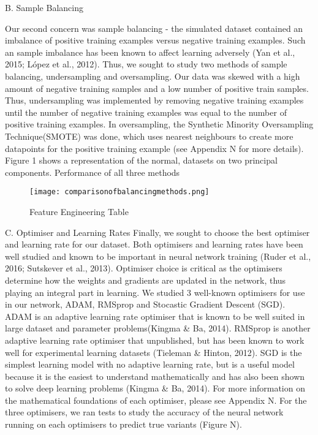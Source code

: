 \documentclass{article}
\begin{document}
B. Sample Balancing

Our second concern was sample balancing - the simulated dataset contained an imbalance of positive training examples versus negative training examples. Such an sample imbalance has been known to affect learning adversely (Yan et al., 2015; López et al., 2012). Thus, we sought to study two methods of sample balancing, undersampling and oversampling. Our data was skewed with a high amount of negative training samples and  a low number of positive train samples. Thus, undersampling was implemented by removing negative training examples until the number of negative training examples was equal to the number of positive training examples. In oversampling, the Synthetic Minority Oversampling Technique(SMOTE) was done, which uses nearest neighbours to create more datapoints for the positive training example (see Appendix N for more details). Figure 1 shows a representation of the normal, datasets on two principal components. Performance of all three methods 	


\begin{figure}[H]
\caption{Feature Engineering Table}
\texttt{[image: comparisonofbalancingmethods.png]}
\centering
\end{figure}

C. Optimiser and Learning Rates
Finally, we sought to choose the best optimiser and learning rate for our dataset. Both optimisers and learning rates have  been well studied and known to be important in neural network training (Ruder et al., 2016; Sutskever et al., 2013). Optimiser choice is critical as the optimisers determine how the weights and gradients are updated in the network, thus playing an integral part in learning. We studied 3 well-known optimisers for use in our network, ADAM, RMSprop and Stocastic Gradient Descent (SGD). ADAM is an adaptive learning rate optimiser that is known to be well suited in large dataset and parameter problems(Kingma \& Ba, 2014). RMSprop is another adaptive learning rate optimiser that unpublished, but has been known to work well for experimental learning datasets (Tieleman & Hinton, 2012). SGD is the simplest learning model with no adaptive learning rate, but is a useful model because it is the easiest to understand mathematically and has also been shown to solve deep learning problems (Kingma \& Ba, 2014). For more information on the mathematical foundations of each optimiser, please see Appendix N. For the three optimisers, we ran tests to study the accuracy of the neural network running on each optimisers to predict true variants (Figure N).
\end{document}
